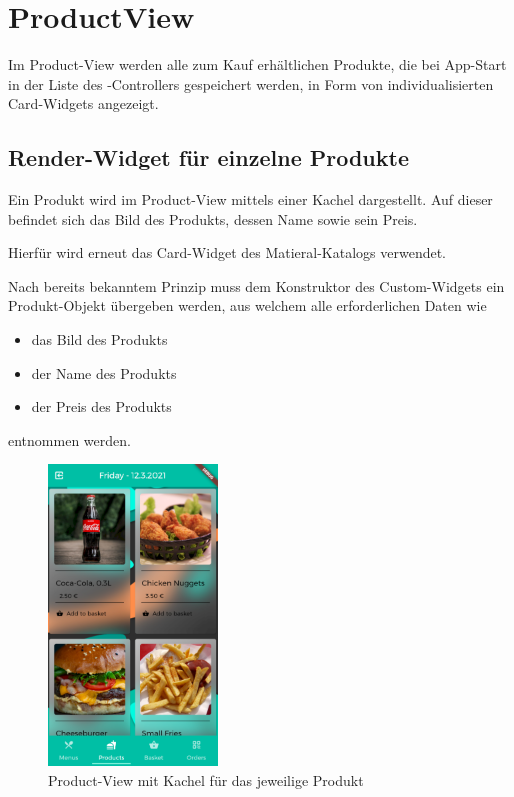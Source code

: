 \section{ProductView}

Im Product-View werden alle zum Kauf erhältlichen Produkte, die bei App-Start in der Liste des
-Controllers gespeichert werden, in Form von individualisierten Card-Widgets angezeigt.

\subsection{Render-Widget für einzelne Produkte}

Ein Produkt wird im Product-View mittels einer Kachel dargestellt. Auf dieser befindet sich 
das Bild des Produkts, dessen Name sowie sein Preis.

Hierfür wird erneut das Card-Widget des Matieral-Katalogs verwendet.

Nach bereits bekanntem Prinzip muss dem Konstruktor des Custom-Widgets ein Produkt-Objekt
übergeben werden, aus welchem alle erforderlichen Daten wie

\begin{itemize}
    \item das Bild des Produkts
    \item der Name des Produkts
    \item der Preis des Produkts
\end{itemize}

entnommen werden.

\begin{figure}[H]
    \centering
    \includegraphics[width=0.40\textwidth]{images/Client/views/productview/productview.png}
    \caption{Product-View mit Kachel für das jeweilige Produkt}
\end{figure}

